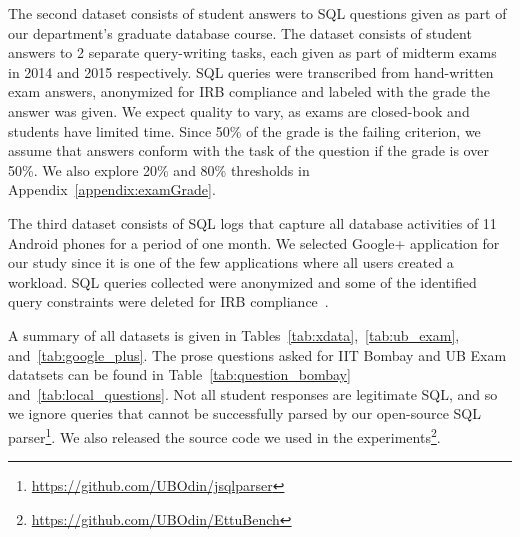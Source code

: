 The second dataset consists of student answers to SQL questions given as part of 
our department's
graduate database course.
The dataset consists of student answers to 2 separate query-writing tasks, each given as part of midterm exams in 2014 and 2015 respectively.
SQL queries were transcribed from hand-written exam answers, anonymized for IRB compliance and labeled with the grade the answer was given.
We expect quality to vary, as exams are closed-book and students have limited time. 
Since 50\% of the grade is the failing criterion, we assume that answers conform with the task of the question if the grade is over 50\%. We also explore 20\% and 80\% thresholds in Appendix~\ref{appendix:examGrade}.

The third dataset consists of SQL logs that capture all database activities of 11 Android phones for a period of one month.
We selected Google+ application for our study since it is one of the few applications where all users created a workload.
SQL queries collected were anonymized and some of the identified query constraints were deleted for IRB compliance~\cite{pocketdata}.

A summary of all datasets is given in Tables~\ref{tab:xdata},~\ref{tab:ub_exam}, and~\ref{tab:google_plus}.
The prose questions asked for IIT Bombay and UB Exam datatsets can be found in Table~\ref{tab:question_bombay} and~\ref{tab:local_questions}.
Not all student responses are legitimate SQL, and so we ignore queries that cannot be successfully parsed by our open-source SQL parser\footnote{
\url{https://github.com/UBOdin/jsqlparser}
}. We also released the source code we used in the experiments\footnote{ 
\url{https://github.com/UBOdin/EttuBench}
}.

